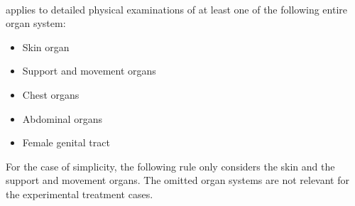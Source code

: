 





\paragraph{}
 applies to detailed physical examinations of at least one of the following entire organ system:
\begin{itemize}
    \item Skin organ
    \item Support and movement organs
    \item Chest organs
    \item Abdominal organs
    \item Female genital tract
\end{itemize}
For the case of simplicity, the following rule only considers the skin and the support and movement organs.
The omitted organ systems are not relevant for the experimental treatment cases.



